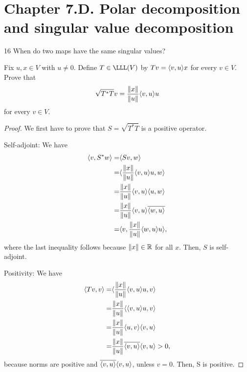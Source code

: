\section*{Chapter 7.D. Polar decomposition and singular value decomposition}

16 When do two maps have the same singular values?

\begin{exercise}{1}
  Fix $u,x\in V$ with $u\neq 0$. Define $T\in\LLL(V)$ by $Tv =\langle v,u\rangle x$ for every $v\in V$. Prove that
  \[
  \sqrt{T^\ast T}v=\frac{\left\lVert x\right\rVert}{\left\lVert u\right\rVert}\langle v,u\rangle u
  \]
  for every $v\in V$.
\end{exercise}
\begin{proof}
 We first have to prove that $S=\sqrt{T^\ast T}$ is a positive operator.
 
 Self-adjoint: We have 
 \begin{align*}
     \langle v, S^\ast w\rangle =& \langle Sv, w\rangle\\
     =& \langle \frac{\left\lVert x\right\rVert}{\left\lVert u\right\rVert}\langle v,u\rangle u, w\rangle\\
     =& \frac{\left\lVert x\right\rVert}{\left\lVert u\right\rVert}\langle v,u\rangle\langle u, w\rangle\\
     =& \frac{\left\lVert x\right\rVert}{\left\lVert u\right\rVert}\langle v,u\rangle\overline{\langle w, u\rangle}\\
     =& \langle v,\frac{\left\lVert x\right\rVert}{\left\lVert u\right\rVert}\langle w, u\rangle u\rangle,
 \end{align*}
 where the last inequality follows because $\left\lVert x\right\rVert\in\mathbb{R}$ for all $x$. Then, $S$ is self-adjoint.

 Positivity: We have
 \begin{align*}
     \langle Tv,v\rangle =& \langle \frac{\left\lVert x\right\rVert}{\left\lVert u\right\rVert}\langle v,u\rangle u,v\rangle\\
     =& \frac{\left\lVert x\right\rVert}{\left\lVert u\right\rVert}\langle \langle v,u\rangle u,v\rangle\\
     =& \frac{\left\lVert x\right\rVert}{\left\lVert u\right\rVert}\langle u,v\rangle\langle v,u\rangle\\
     =& \frac{\left\lVert x\right\rVert}{\left\lVert u\right\rVert}\overline{\langle v,u\rangle}\langle v,u\rangle>0,
 \end{align*}
 because norms are positive and $\overline{\langle v,u\rangle}\langle v,u\rangle$, unless $v=0$. Then, S is positive.
 

\end{proof}
